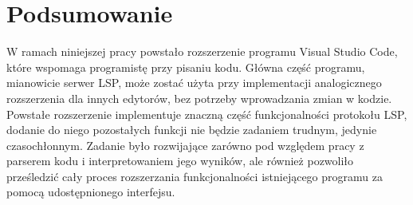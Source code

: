 \chapter{Podsumowanie}
W ramach niniejszej pracy powstało rozszerzenie programu Visual Studio Code, które wspomaga programistę przy pisaniu kodu. Główna część programu, mianowicie serwer LSP, może zostać użyta przy implementacji analogicznego rozszerzenia dla innych edytorów, bez potrzeby wprowadzania zmian w kodzie. 
Powstałe rozszerzenie implementuje znaczną część funkcjonalności protokołu LSP, dodanie do niego pozostałych funkcji nie będzie zadaniem trudnym, jedynie czasochłonnym. Zadanie było rozwijające zarówno pod względem pracy z parserem kodu i interpretowaniem jego wyników, ale również pozwoliło prześledzić cały proces rozszerzania funkcjonalności istniejącego programu za pomocą udostępnionego interfejsu.